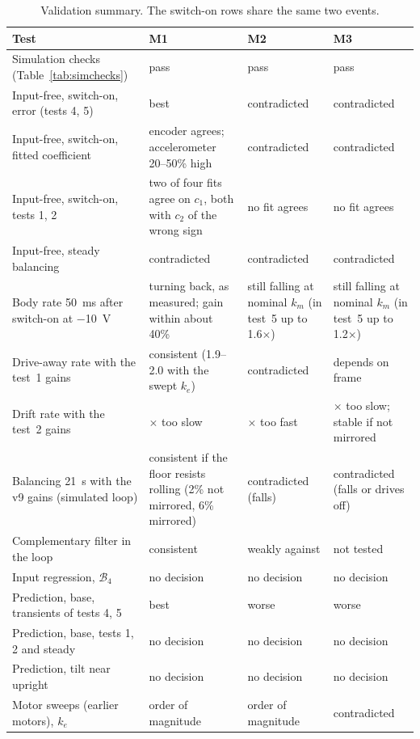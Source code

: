\begin{table}[htbp]
\centering
\caption{Validation summary. The switch-on rows share the same two events.}
\label{tab:verdict}
\small
\begin{tabular}{>{\raggedright\arraybackslash}p{}>{\raggedright\arraybackslash}p{}>{\raggedright\arraybackslash}p{}>{\raggedright\arraybackslash}p{}}
\toprule
Test & M1 & M2 & M3 \\
\midrule
Simulation checks (Table~\ref{tab:simchecks}) & pass & pass & pass \\
Input-free, switch-on, error (tests 4, 5) & best & contradicted & contradicted \\
Input-free, switch-on, fitted coefficient & encoder agrees; accelerometer 20--50\% high & contradicted & contradicted \\
Input-free, switch-on, tests 1, 2 & two of four fits agree on $c_1$, both with $c_2$ of the wrong sign & no fit agrees & no fit agrees \\
Input-free, steady balancing & contradicted & contradicted & contradicted \\
Body rate \SI{50}{ms} after switch-on at \SI{-10}{V} & turning back, as measured; gain within about 40\% & still falling at nominal $k_m$ (in test~5 up to 1.6$\times$) & still falling at nominal $k_m$ (in test~5 up to 1.2$\times$) \\
Drive-away rate with the test~1 gains & consistent (1.9--2.0 with the swept $k_e$) & contradicted & depends on frame \\
Drift rate with the test~2 gains & 2.5$\times$ too slow & 2.4$\times$ too fast & 2.2$\times$ too slow; stable if not mirrored \\
Balancing \SI{21}{s} with the v9 gains (simulated loop) & consistent if the floor resists rolling (2\% not mirrored, 6\% mirrored) & contradicted (falls) & contradicted (falls or drives off) \\
Complementary filter in the loop & consistent & weakly against & not tested \\
Input regression, $\mathcal{B}_4$ & no decision & no decision & no decision \\
Prediction, base, transients of tests 4, 5 & best & worse & worse \\
Prediction, base, tests 1, 2 and steady & no decision & no decision & no decision \\
Prediction, tilt near upright & no decision & no decision & no decision \\
Motor sweeps (earlier motors), $k_e$ & order of magnitude & order of magnitude & contradicted \\
\bottomrule
\end{tabular}
\end{table}

